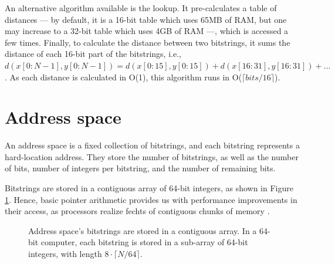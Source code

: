 An alternative algorithm available is the lookup. It pre-calculates a table of distances --- by default, it is a 16-bit table which uses 65MB of RAM, but one may increase to a 32-bit table which uses 4GB of RAM ---, which is accessed a few times. Finally, to calculate the distance between two bitstrings, it sums the distance of each 16-bit part of the bitstrings, i.e., $d(x[0:N-1], y[0:N-1]) = d(x[0:15], y[0:15]) + d(x[16:31], y[16:31]) + \dots$. As each distance is calculated in O(1), this algorithm runs in O($\lceil bits/16 \rceil$).


\section{Address space}

An address space is a fixed collection of bitstrings, and each bitstring represents a hard-location address. They store the number of bitstrings, as well as the number of bits, number of integers per bitstring, and the number of remaining bits.

Bitstrings are stored in a contiguous array of 64-bit integers, as shown in Figure \ref{tab:hl-addresses-detail}. Hence, basic pointer arithmetic provides us with performance improvements in their access, as processors realize fechts of contiguous chunks of memory  \citep{pai2004linux}.

\begin{figure}
\centering
{}

\caption{Address space's bitstrings are stored in a contiguous array. In a 64-bit computer, each bitstring is stored in a sub-array of 64-bit integers, with length $8 \cdot \lceil N/64 \rceil$.\label{tab:hl-addresses-detail}}
\end{figure}

